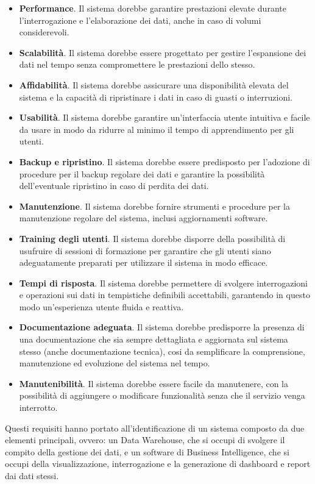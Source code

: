 \begin{itemize}
    \item \textbf{Performance}. Il sistema dorebbe garantire prestazioni elevate durante l'interrogazione e l'elaborazione dei dati, anche in caso di volumi considerevoli.
    \item \textbf{Scalabilità}. Il sistema dorebbe essere progettato per gestire l'espansione dei dati nel tempo senza compromettere le prestazioni dello stesso.
    \item \textbf{Affidabilità}. Il sistema dorebbe assicurare una disponibilità elevata del sistema e la capacità di ripristinare i dati in caso di guasti o interruzioni.
    \item \textbf{Usabilità}. Il sistema dorebbe garantire un'interfaccia utente intuitiva e facile da usare in modo da ridurre al minimo il tempo di apprendimento per gli utenti.
    \item \textbf{Backup e ripristino}. Il sistema dorebbe essere predisposto per l'adozione di procedure per il backup regolare dei dati e garantire la possibilità dell'eventuale ripristino in caso di perdita dei dati.
    \item \textbf{Manutenzione}. Il sistema dorebbe fornire strumenti e procedure per la manutenzione regolare del sistema, inclusi aggiornamenti software.
    \item \textbf{Training degli utenti}. Il sistema dorebbe disporre della possibilità di usufruire di sessioni di formazione per garantire che gli utenti siano adeguatamente preparati per utilizzare il sistema in modo efficace.
    \item \textbf{Tempi di risposta}. Il sistema dorebbe permettere di svolgere interrogazioni e operazioni sui dati in tempistiche definibili accettabili, garantendo in questo modo un'esperienza utente fluida e reattiva.
    \item \textbf{Documentazione adeguata}. Il sistema dorebbe predisporre la presenza di una documentazione che sia sempre dettagliata e aggiornata sul sistema stesso (anche documentazione tecnica), cosi da semplificare la comprensione, manutenzione ed evoluzione del sistema nel tempo.
    \item \textbf{Manutenibilità}. Il sistema dorebbe essere facile da manutenere, con la possibilità di aggiungere o modificare funzionalità senza che il servizio venga interrotto.
\end{itemize}

Questi requisiti hanno portato all'identificazione di un sistema composto da due elementi principali, ovvero: un Data Warehouse, che si occupi di svolgere il compito della gestione dei dati, e un software di Business Intelligence, che si occupi della visualizzazione, interrogazione e la generazione di dashboard e report dai dati stessi.

